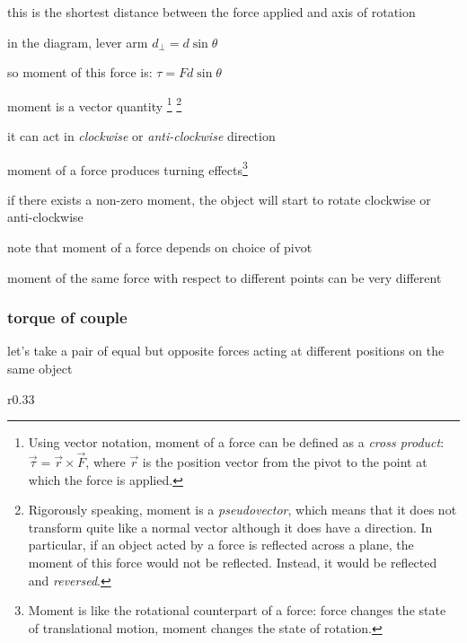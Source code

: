 this is the shortest distance between the force applied and axis of rotation

in the diagram, lever arm $d_\perp = d\sin\theta$

so moment of this force is: $\tau = Fd\sin\theta$

\cmt moment is a vector quantity
\footnote{Using vector notation, moment of a force can be defined as a \emph{cross product}: $\overrightarrow{\tau} = \overrightarrow{r}\times\overrightarrow{F}$, where $\overrightarrow{r}$ is the position vector from the pivot to the point at which the force is applied.}
\footnote{Rigorously speaking, moment is a \emph{pseudovector}, which means that it does not transform quite like a normal vector although it does have a direction. In particular, if an object acted by a force is reflected across a plane, the moment of this force would not be reflected. Instead, it would be reflected and \emph{reversed}.}

it can act in \emph{clockwise} or \emph{anti-clockwise} direction

\cmt moment of a force produces turning effects\footnote{Moment is like the rotational counterpart of a force: force changes the state of translational motion, moment changes the state of rotation.}

if there exists a non-zero moment, the object will start to rotate clockwise or anti-clockwise

\cmt note that moment of a force depends on choice of pivot

moment of the same force with respect to different points can be very different



\subsubsection{torque of couple}

let's take a pair of equal but opposite forces acting at different positions on the same object

\begin{wrapfigure}{r}{0.33\textwidth}
	\centering
	\vspace*{-8pt}
	\vspace*{-16pt}
\end{wrapfigure}

